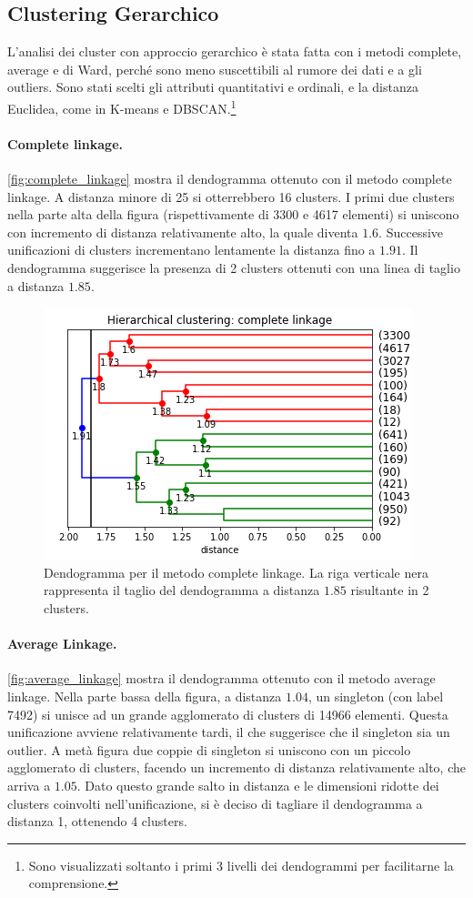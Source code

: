 \documentclass[a4paper]{article}
\begin{document}
\subsection{Clustering Gerarchico}
L'analisi dei cluster con approccio gerarchico è stata fatta con i metodi complete, average e di Ward, perché sono meno suscettibili al rumore dei dati e a gli outliers. Sono stati scelti gli attributi quantitativi e ordinali, e la distanza Euclidea, come in K-means e DBSCAN.\footnote{Sono visualizzati soltanto i primi 3 livelli dei dendogrammi per facilitarne la comprensione.}  

\paragraph{Complete linkage.}
\autoref{fig:complete_linkage} mostra il dendogramma ottenuto con il metodo complete linkage. A distanza minore di 25 si otterrebbero 16 clusters. I primi due clusters nella parte alta della figura (rispettivamente di 3300 e 4617 elementi) si uniscono con incremento di distanza relativamente alto, la quale diventa $1.6$. Successive unificazioni di clusters incrementano lentamente la distanza fino a $1.91$.
Il dendogramma suggerisce la presenza di 2 clusters ottenuti con una linea di taglio a distanza $1.85$.

\begin{figure}[hbtp]
\centering
\includegraphics[width=0.6\columnwidth]{../images/hierarchical_clustering_complete-annotated.png}
\caption{Dendogramma per il metodo complete linkage. La riga verticale nera rappresenta il taglio del dendogramma a distanza $1.85$ risultante in 2 clusters.}
\label{fig:complete_linkage}
\end{figure}

\paragraph{Average Linkage.}
\autoref{fig:average_linkage} mostra il dendogramma ottenuto con il metodo average linkage. Nella parte bassa della figura, a distanza $1.04$, un singleton (con label 7492) si unisce ad un grande agglomerato di clusters di 14966 elementi. Questa unificazione avviene relativamente tardi, il che suggerisce che il singleton sia un outlier. A metà figura due coppie di singleton si uniscono con un piccolo agglomerato di clusters, facendo un incremento di distanza relativamente alto, che arriva a $1.05$. Dato questo grande salto in distanza e le dimensioni ridotte dei clusters coinvolti nell'unificazione, si è deciso di tagliare il dendogramma a distanza 1, ottenendo 4 clusters.
\end{document}
